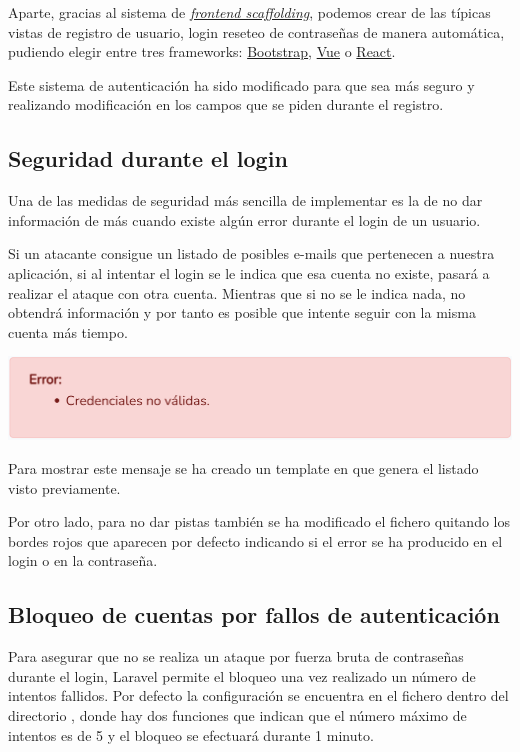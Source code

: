 \documentclass{\ClassPath/viu-tfm-template}
\begin{document}
Aparte, gracias al sistema de \textit{\href{https://laravel.com/docs/6.x/frontend}{frontend scaffolding}}, podemos crear de las típicas vistas de registro de usuario, login  reseteo de contraseñas de manera automática, pudiendo elegir entre tres frameworks: \href{https://getbootstrap.com/}{Bootstrap}, \href{https://vuejs.org/}{Vue} o \href{https://es.reactjs.org/}{React}.

Este sistema de autenticación ha sido modificado para que sea más seguro y realizando modificación en los campos que se piden durante el registro.


\subsection{Seguridad durante el login}
Una de las medidas de seguridad más sencilla de implementar es la de no dar información de más cuando existe algún error durante el login de un usuario.

Si un atacante consigue un listado de posibles e-mails que pertenecen a nuestra aplicación, si al intentar el login se le indica que esa cuenta no existe, pasará a realizar el ataque con otra cuenta. Mientras que si no se le indica nada, no obtendrá información y por tanto es posible que intente seguir con la misma cuenta más tiempo.

\begin{center}
    \includegraphics[width=0.8\linewidth]{img/error_simple.png}
\end{center}

Para mostrar este mensaje se ha creado un template en  que genera el listado visto previamente.

Por otro lado, para no dar pistas también se ha modificado el fichero  quitando los bordes rojos que aparecen por defecto indicando si el error se ha producido en el login o en la contraseña.


\subsection{Bloqueo de cuentas por fallos de autenticación}
Para asegurar que no se realiza un ataque por fuerza bruta  de contraseñas durante el login, Laravel permite el bloqueo una vez realizado un número de intentos fallidos. Por defecto la configuración se encuentra en el fichero  dentro del directorio , donde hay dos funciones que indican que el número máximo de intentos es de 5 y el bloqueo se efectuará durante 1 minuto.
\end{document}
